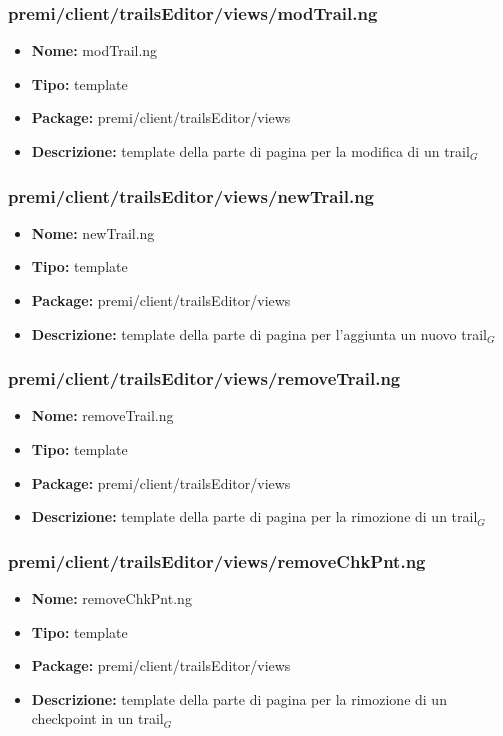 \subsubsection{premi/client/trailsEditor/views/modTrail.ng}
\begin{itemize}
  \item[] \textbf{Nome:} modTrail.ng
  \item[] \textbf{Tipo:} template
  \item[] \textbf{Package:} premi/client/trailsEditor/views
  \item[] \textbf{Descrizione:}  template della parte di pagina per la modifica di un trail$_G$
\end{itemize}
\subsubsection{premi/client/trailsEditor/views/newTrail.ng}
\begin{itemize}
  \item[] \textbf{Nome:} newTrail.ng
  \item[] \textbf{Tipo:} template
  \item[] \textbf{Package:} premi/client/trailsEditor/views
  \item[] \textbf{Descrizione:}  template della parte di pagina per l'aggiunta un nuovo trail$_G$
\end{itemize}
\subsubsection{premi/client/trailsEditor/views/removeTrail.ng}
\begin{itemize}
  \item[] \textbf{Nome:} removeTrail.ng
  \item[] \textbf{Tipo:} template
  \item[] \textbf{Package:} premi/client/trailsEditor/views
  \item[] \textbf{Descrizione:}  template della parte di pagina per la rimozione di un trail$_G$
\end{itemize}
\subsubsection{premi/client/trailsEditor/views/removeChkPnt.ng}
\begin{itemize}
  \item[] \textbf{Nome:} removeChkPnt.ng
  \item[] \textbf{Tipo:} template
  \item[] \textbf{Package:} premi/client/trailsEditor/views
  \item[] \textbf{Descrizione:}  template della parte di pagina per la rimozione di un checkpoint in un trail$_G$
\end{itemize}
